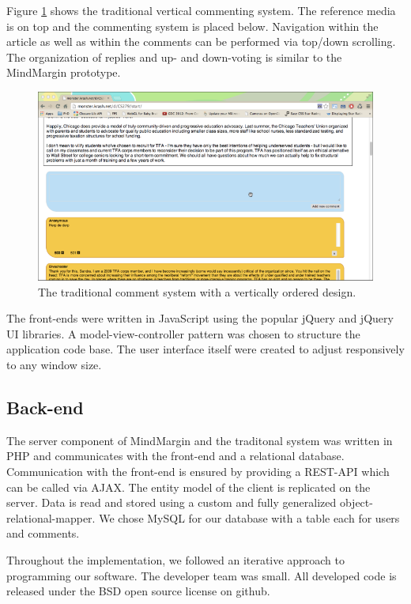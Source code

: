 Figure \ref{fig:traditional} shows the traditional vertical commenting system. The reference media is on top and the commenting system is placed below. Navigation within the article as well as within the comments can be performed via top/down scrolling. The organization of replies and up- and down-voting is similar to the MindMargin prototype.

\begin{figure}
\centering
\includegraphics[scale=0.3]{traditional.png} 
\caption{The traditional comment system with a vertically ordered design.}
\label{fig:traditional}
\end{figure}

The front-ends were written in JavaScript using the popular jQuery and jQuery UI libraries. A model-view-controller pattern was chosen to structure the application code base. The user interface itself were created to adjust responsively to any window size.

\subsection{Back-end}
The server component of MindMargin and the traditonal system was written in PHP and communicates with the front-end and a relational database. Communication with the front-end is ensured by providing a REST-API which can be called via AJAX. The entity model of the client is replicated on the server. Data is read and stored using a custom and fully generalized object-relational-mapper. We chose MySQL for our database with a table each for users and comments.

Throughout the implementation, we followed an iterative approach to programming our software. The developer team was small. All developed code is released under the BSD open source license on github.